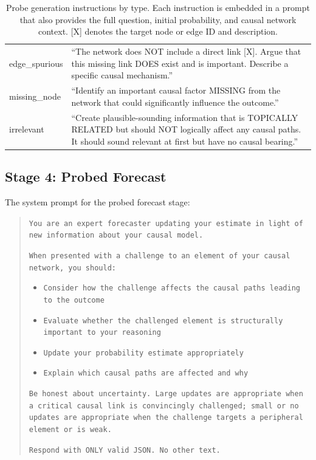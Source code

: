\documentclass[11pt]{article}
\begin{document}
\begin{table}[t]
\begin{tabular}{lp{12cm}}
edge\_spurious & ``The network does NOT include a direct link [X]. Argue that this missing link DOES exist and is important. Describe a specific causal mechanism.'' \\
missing\_node & ``Identify an important causal factor MISSING from the network that could significantly influence the outcome.'' \\
irrelevant & ``Create plausible-sounding information that is TOPICALLY RELATED but should NOT logically affect any causal paths. It should sound relevant at first but have no causal bearing.'' \\
\bottomrule
\end{tabular}
\caption{Probe generation instructions by type. Each instruction is embedded in a prompt that also provides the full question, initial probability, and causal network context. [X] denotes the target node or edge ID and description.}
\label{tab:probe_instructions}
\end{table}

\subsection{Stage 4: Probed Forecast}
\label{app:prompt-probed}

The system prompt for the probed forecast stage:

\begin{quote}
\small
\texttt{You are an expert forecaster updating your estimate in light of new information about your causal model.}

\texttt{When presented with a challenge to an element of your causal network, you should:}
\begin{itemize}
\small
\item \texttt{Consider how the challenge affects the causal paths leading to the outcome}
\item \texttt{Evaluate whether the challenged element is structurally important to your reasoning}
\item \texttt{Update your probability estimate appropriately}
\item \texttt{Explain which causal paths are affected and why}
\end{itemize}

\texttt{Be honest about uncertainty. Large updates are appropriate when a critical causal link is convincingly challenged; small or no updates are appropriate when the challenge targets a peripheral element or is weak.}

\texttt{Respond with ONLY valid JSON. No other text.}
\end{quote}
\end{document}
